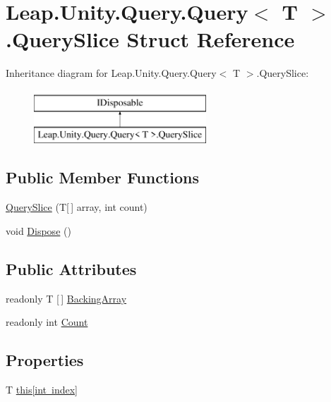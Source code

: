 \hypertarget{struct_leap_1_1_unity_1_1_query_1_1_query_1_1_query_slice}{}\section{Leap.\+Unity.\+Query.\+Query$<$ T $>$.Query\+Slice Struct Reference}
\label{struct_leap_1_1_unity_1_1_query_1_1_query_1_1_query_slice}
Inheritance diagram for Leap.\+Unity.\+Query.\+Query$<$ T $>$.Query\+Slice\+:\begin{figure}[H]
\begin{center}
\leavevmode
\includegraphics[height=2.000000cm]{struct_leap_1_1_unity_1_1_query_1_1_query_1_1_query_slice}
\end{center}
\end{figure}
\subsection*{Public Member Functions}
\begin{DoxyCompactItemize}
\item 
\mbox{\hyperlink{struct_leap_1_1_unity_1_1_query_1_1_query_1_1_query_slice_a6183738029036bc563835eee8fee7dbc}{Query\+Slice}} (T\mbox{[}$\,$\mbox{]} array, int count)
\item 
void \mbox{\hyperlink{struct_leap_1_1_unity_1_1_query_1_1_query_1_1_query_slice_ac55109634717c8cbbc44aefb5c686040}{Dispose}} ()
\end{DoxyCompactItemize}
\subsection*{Public Attributes}
\begin{DoxyCompactItemize}
\item 
readonly T \mbox{[}$\,$\mbox{]} \mbox{\hyperlink{struct_leap_1_1_unity_1_1_query_1_1_query_1_1_query_slice_a58cf958adb993f6899d6cf781275ffd5}{Backing\+Array}}
\item 
readonly int \mbox{\hyperlink{struct_leap_1_1_unity_1_1_query_1_1_query_1_1_query_slice_a6075d2a16ccb46aa50e334152f61ddab}{Count}}
\end{DoxyCompactItemize}
\subsection*{Properties}
\begin{DoxyCompactItemize}
\item 
T \mbox{\hyperlink{struct_leap_1_1_unity_1_1_query_1_1_query_1_1_query_slice_a34e22931e27acc329a9eabef65040823}{this\mbox{[}int index\mbox{]}}}
\end{DoxyCompactItemize}


